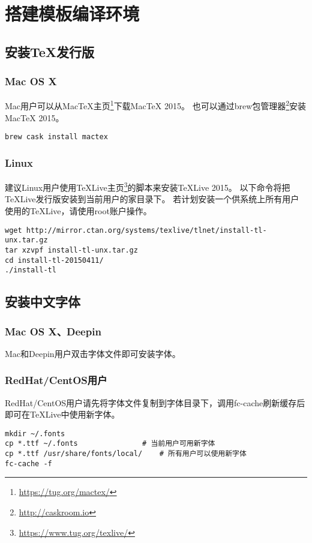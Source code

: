 \chapter{搭建模板编译环境}

\section{安装TeX发行版}

\subsection{Mac OS X}

Mac用户可以从MacTeX主页\footnote{\url{https://tug.org/mactex/}}下载MacTeX 2015。
也可以通过brew包管理器\footnote{\url{http://caskroom.io}}安装MacTeX 2015。

\begin{lstlisting}[basicstyle=\small\ttfamily, numbers=none]
brew cask install mactex
\end{lstlisting}

\subsection{Linux}

建议Linux用户使用TeXLive主页\footnote{\url{https://www.tug.org/texlive/}}的脚本来安装TeXLive 2015。
以下命令将把TeXLive发行版安装到当前用户的家目录下。
若计划安装一个供系统上所有用户使用的TeXLive，请使用root账户操作。

\begin{lstlisting}[basicstyle=\small\ttfamily, numbers=none]
wget http://mirror.ctan.org/systems/texlive/tlnet/install-tl-unx.tar.gz
tar xzvpf install-tl-unx.tar.gz
cd install-tl-20150411/
./install-tl
\end{lstlisting}

\section{安装中文字体}

\subsection{Mac OS X、Deepin}

Mac和Deepin用户双击字体文件即可安装字体。

\subsection{RedHat/CentOS用户}

RedHat/CentOS用户请先将字体文件复制到字体目录下，调用fc-cache刷新缓存后即可在TeXLive中使用新字体。

\begin{lstlisting}[basicstyle=\small\ttfamily, numbers=none]
mkdir ~/.fonts
cp *.ttf ~/.fonts				# 当前用户可用新字体
cp *.ttf /usr/share/fonts/local/	# 所有用户可以使用新字体
fc-cache -f
\end{lstlisting}


